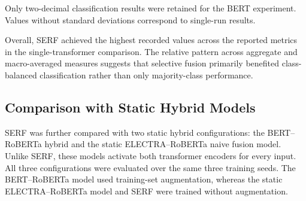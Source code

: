 \documentclass[runningheads]{llncs}
\begin{document}
\begin{table}[!h]
\caption{Comparison with single-transformer baselines.}\label{tab:single-transformer-comparison}
\centering
\setlength{\tabcolsep}{4pt}
\scriptsize
{}
\end{table}

Only two-decimal classification results were retained for the BERT experiment. Values without standard deviations correspond to single-run results.

Overall, SERF achieved the highest recorded values across the reported metrics in the single-transformer comparison. The relative pattern across aggregate and macro-averaged measures suggests that selective fusion primarily benefited class-balanced classification rather than only majority-class performance.

\subsection{Comparison with Static Hybrid Models}\label{sec:static-hybrid-comparison}

SERF was further compared with two static hybrid configurations: the BERT--RoBERTa hybrid and the static ELECTRA--RoBERTa naive fusion model. Unlike SERF, these models activate both transformer encoders for every input. All three configurations were evaluated over the same three training seeds. The BERT--RoBERTa model used training-set augmentation, whereas the static ELECTRA--RoBERTa model and SERF were trained without augmentation.
\end{document}
